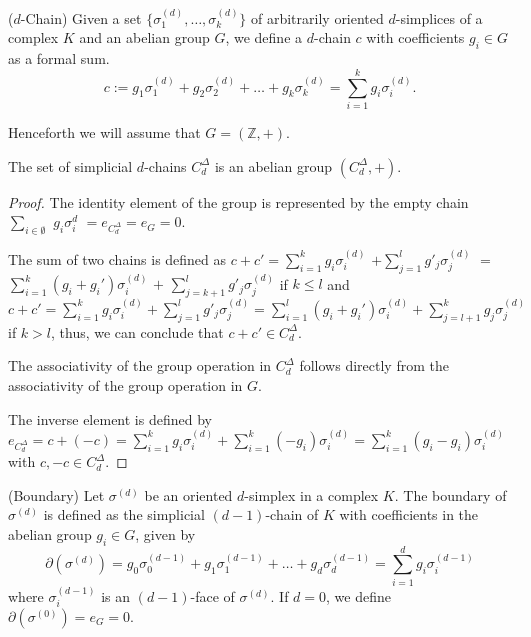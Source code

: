 \begin{definition}{($d$-Chain) \cite[§2.3]{zomorodian2004computing}}
\label{d-chain}
Given a set $\{\sigma_1^{(d)}, \ldots, \sigma_k^{(d)}\}$ of arbitrarily oriented $d$-simplices of a complex $K$ and an abelian group $G$, we define a $d$-chain $c$ with coefficients $g_i \in G$ as a formal sum.
\begin{equation}
c := g_1 \sigma^{(d)}_1 + g_2 \sigma^{(d)}_2 + \ldots + g_k \sigma^{(d)}_k = \sum_{i=1}^{k} g_i \sigma^{(d)}_i.
\end{equation}
\end{definition}

Henceforth we will assume that $G = (\mathbb{Z},+)$.

\begin{lemma}
The set of simplicial $d$-chains $C^\Delta_d$ is an abelian group $(C^\Delta_d,+)$.
\end{lemma}
\begin{proof}
The identity element of the group is represented by the empty chain $\sum_{i \in \emptyset}$ $g_i \sigma^{d}_i$ $= e_{C_d^\Delta} = e_G = 0$.

The sum of two chains is defined as $c+c' = \sum_{i=1}^{k} g_i \sigma_i^{(d)}$ $+ \sum_{j=1}^{l} g'_j \sigma_j^{(d)}$ $=$ $\sum_{i=1}^{k} (g_i+g_i') \sigma_i^{(d)}$ $+$ $\sum_{j=k+1}^{l} g'_j \sigma_j^{(d)}$ if $k \leq l$ and $c+c' = \sum_{i=1}^{k} g_i \sigma_i^{(d)} + \sum_{j=1}^{l} g'_j \sigma_j^{(d)} = \sum_{i=1}^{l} (g_i+g_i') \sigma_i^{(d)} + \sum_{j=l+1}^{k} g_j \sigma_j^{(d)}$ if $k > l$, thus, we can conclude that $c+c' \in C^\Delta_d$.

The associativity of the group operation in $C^\Delta_d$ follows directly from the associativity of the group operation in $G$.

The inverse element is defined by $e_{C^\Delta_d} = c + (-c) = \sum_{i=1}^{k} g_i \sigma_i^{(d)} + \sum_{i=1}^{k} (-g_i) \sigma_i^{(d)} = \sum_{i=1}^{k} (g_i-g_i) \sigma_i^{(d)}$ with $c,-c \in C^\Delta_d$.
\end{proof}

\begin{definition}{(Boundary) \cite[p.106]{hatcher2005algebraic}}
Let $\sigma^{(d)}$ be an oriented $d$-simplex in a complex $K$. The boundary of $\sigma^{(d)}$ is defined as the simplicial $(d-1)$-chain of $K$ with coefficients in the abelian group $g_i \in G$, given by
\begin{equation}
\partial(\sigma^{(d)}) = g_0 \sigma^{(d-1)}_0 + g_1 \sigma^{(d-1)}_1 + \ldots + g_d \sigma^{(d-1)}_d = \sum_{i=1}^{d} g_i \sigma^{(d-1)}_i
\end{equation}
where $\sigma^{(d-1)}_i$ is an $(d-1)$-face of $\sigma^{(d)}$. If $d=0$, we define $\partial(\sigma^{(0)}) = e_G = 0$.
\end{definition}

